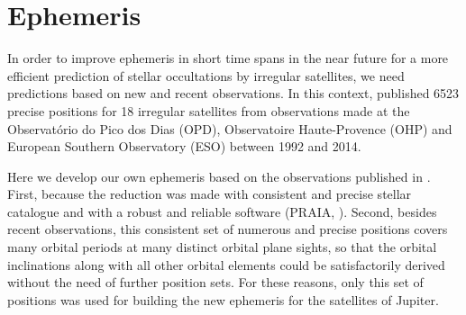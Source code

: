 \section{Ephemeris} \label{Sec: integration}

In order to improve ephemeris in short time spans in the near future for a more efficient prediction of stellar occultations by irregular satellites, we need predictions based on new and recent observations. In this context, \cite{GomesJunior2015} published 6523 precise positions for 18 irregular satellites from observations made at the Observatório do Pico dos Dias (OPD), Observatoire Haute-Provence (OHP) and European Southern Observatory (ESO) between 1992 and 2014. %

Here we develop our own ephemeris based on the observations published in \cite{GomesJunior2015}. First, because the reduction was made with consistent and precise stellar catalogue and with a robust and reliable software (PRAIA, \cite{Assafin2011}). Second, besides recent observations, this consistent set of numerous and precise positions covers many orbital periods at many distinct orbital plane sights, so that the orbital inclinations along with all other orbital elements could be satisfactorily derived without the need of further position sets. For these reasons, only this set of positions was used for building the new ephemeris for the satellites of Jupiter.


